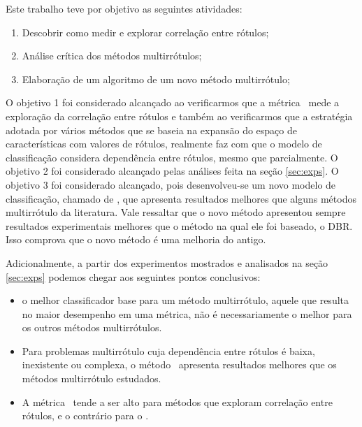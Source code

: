 Este trabalho teve por objetivo as seguintes atividades:
\begin{enumerate}
 \item Descobrir como medir e explorar correlação entre rótulos;
 \item Análise crítica dos métodos multirrótulos;
 \item Elaboração de um algoritmo de um novo método multirrótulo;
\end{enumerate}
O objetivo 1 foi considerado alcançado ao verificarmos que a métrica \SA~mede a 
exploração da correlação entre rótulos e também ao verificarmos que a estratégia adotada por vários 
métodos que se baseia na expansão do espaço de características com valores de rótulos, realmente
faz com que o modelo de classificação considera dependência entre rótulos, mesmo que parcialmente.
O objetivo 2 foi considerado alcançado pelas análises feita na seção \ref{sec:exps}.
O objetivo 3 foi considerado alcançado, pois desenvolveu-se um novo modelo de classificação,
chamado de \MRLM, que apresenta resultados melhores que alguns métodos multirrótulo da literatura.
Vale ressaltar que o novo método apresentou sempre resultados experimentais melhores que o método na qual
ele foi baseado, o DBR. Isso comprova que o novo método é uma melhoria do antigo.

Adicionalmente, a partir dos experimentos mostrados e analisados na seção \ref{sec:exps} podemos
chegar aos seguintes pontos conclusivos:
  \begin{itemize}
   \item o melhor classificador base para um método multirrótulo, aquele que resulta no maior desempenho em uma métrica,
   não é necessariamente o melhor para os outros métodos multirrótulos. 
   \item Para problemas multirrótulo cuja dependência entre rótulos é baixa, inexistente ou complexa, o
   método \BR~apresenta resultados melhores que os métodos multirrótulo estudados.
   \item A métrica \SA~tende a ser alto para métodos que exploram correlação entre rótulos, e o contrário
   para o \HL.
  \end{itemize}


  
